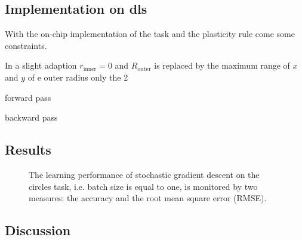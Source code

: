 \subsection{Implementation on \gls{dls}}






With the on-chip implementation of the task and the plasticity rule come some constraints.



In a slight adaption $r_{\text{inner}} = 0$ and $R_{\text{outer}}$ is replaced by the maximum range of $x$ and $y$ of e outer radius only the 2
%

forward pass

backward pass

\subsection{Results}


\begin{figure}
	\label{circles_acc}
	\begin{center}
		
	\end{center}
	\caption{The learning performance of stochastic gradient descent on the circles task, i.e. batch size is equal to one, is monitored by two measures: the accuracy and the root mean square error (RMSE).}
\end{figure}
\subsection{Discussion}